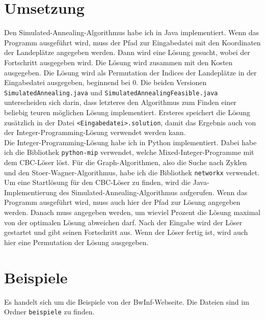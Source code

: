 \documentclass[a4paper,10pt,ngerman]{scrartcl}
\begin{document}
\section{Umsetzung}
Den Simulated-Annealing-Algorithmus habe ich in Java implementiert. Wenn das
Programm ausgeführt wird, muss der Pfad zur Eingabedatei mit den Koordinaten
der Landeplätze angegeben werden. Dann wird eine Lösung gesucht, wobei der
Fortschritt ausgegeben wird. Die Lösung wird zusammen mit den Kosten
ausgegeben. Die Lösung wird als Permutation der Indices der Landeplätze in der
Eingabedatei ausgegeben, beginnend bei 0. Die beiden Versionen
\lstinline|SimulatedAnnealing.java| und
\lstinline|SimulatedAnnealingFeasible.java| unterscheiden sich darin, dass
letzteres den Algorithmus zum Finden einer beliebig teuren möglichen Lösung
implementiert. Ersteres speichert die Lösung zusätzlich in der Datei
\lstinline|<Eingabedatei>.solution|, damit das Ergebnis auch von der
Integer-Programming-Lösung verwendet werden kann. \\ Die
Integer-Programming-Lösung habe ich in Python implementiert. Dabei habe ich die
Bibliothek \lstinline|python-mip| verwendet, welche Mixed-Integer-Programme mit
dem CBC-Löser löst. Für die Graph-Algorithmen, also die Suche nach Zyklen und
den Stoer-Wagner-Algorithmus, habe ich die Bibliothek \lstinline|networkx|
verwendet. Um eine Startlösung für den CBC-Löser zu finden, wird die
Java-Implementierung des Simulated-Annealing-Algorithmus aufgerufen. Wenn das
Programm ausgeführt wird, muss auch hier der Pfad zur Lösung angegeben werden.
Danach muss angegeben werden, um wieviel Prozent die Lösung maximal von der
optimalen Lösung abweichen darf. Nach der Eingabe wird der Löser gestartet und
gibt seinen Fortschritt aus. Wenn der Löser fertig ist, wird auch hier eine
Permutation der Lösung ausgegeben.

\section{Beispiele}
Es handelt sich um die Beispiele von der BwInf-Webseite. Die Dateien sind im
Ordner \lstinline|beispiele| zu finden.
\end{document}
